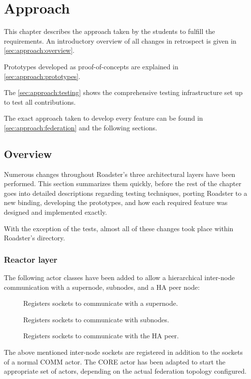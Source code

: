 \chapter{Approach}\label{ch:approach}
This chapter describes the approach taken by the students to fulfill the
requirements. An introductory overview of all changes in retrospect is given in
\autoref{sec:approach:overview}.

Prototypes developed as proof-of-concepts are explained in
\autoref{sec:approach:prototypes}.

The \autoref{sec:approach:testing} shows the comprehensive testing
infrastructure set up to test all contributions.

The exact approach taken to develop every feature can be found in
\autoref{sec:approach:federation} and the following sections.


\section{Overview}\label{sec:approach:overview}
Numerous changes throughout Roadster's three architectural layers have been
performed. This section summarizes them quickly, before the rest of the chapter
goes into detailed descriptions regarding testing techniques, porting Roadster
to a new \zmq binding, developing the prototypes, and how each required feature
was designed and implemented exactly.

With the exception of the tests, almost all of these changes took place within
Roadster's  directory.

\subsection{Reactor layer}
The following actor classes have been added to allow a hierarchical inter-node
communication with a supernode, subnodes, and a HA peer node:
\begin{description}
	\item [] Registers sockets to communicate with a supernode.
	\item [] Registers sockets to communicate with subnodes.
	\item [] Registers sockets to communicate with the \gls{HA} peer.
\end{description}
The above mentioned inter-node sockets are registered in addition to the sockets of a normal COMM actor.
The CORE actor  has been adapted to start the
appropriate set of actors, depending on the actual federation topology
configured.

